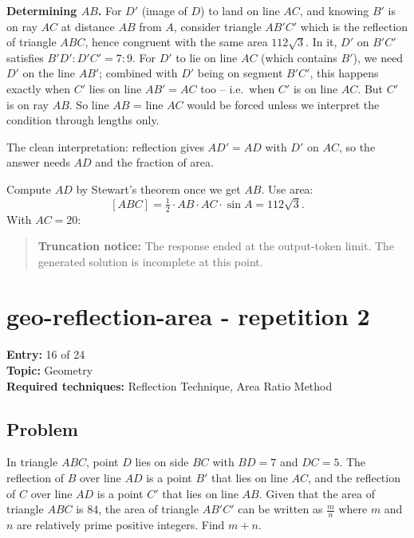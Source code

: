 \documentclass[
  11pt,
  letterpaper,
]{article}
\begin{document}
\textbf{Determining \(AB\).} For \(D'\) (image of \(D\)) to land on line
\(AC\), and knowing \(B'\) is on ray \(AC\) at distance \(AB\) from
\(A\), consider triangle \(AB'C'\) which is the reflection of triangle
\(ABC\), hence congruent with the same area \(112\sqrt3\). In it, \(D'\)
on \(B'C'\) satisfies \(B'D':D'C' = 7:9\). For \(D'\) to lie on line
\(AC\) (which contains \(B'\)), we need \(D'\) on the line \(AB'\);
combined with \(D'\) being on segment \(B'C'\), this happens exactly
when \(C'\) lies on line \(AB'=AC\) too -- i.e.~when \(C'\) is on line
\(AC\). But \(C'\) is on ray \(AB\). So line \(AB\) = line \(AC\) would
be forced unless we interpret the condition through lengths only.

The clean interpretation: reflection gives \(AD' = AD\) with \(D'\) on
\(AC\), so the answer needs \(AD\) and the fraction of area.

Compute \(AD\) by Stewart's theorem once we get \(AB\). Use area:
\[[ABC] = \tfrac12 \cdot AB \cdot AC \cdot \sin A = 112\sqrt3.\] With
\(AC = 20\):

\begin{quote}
\textbf{Truncation notice:} The response ended at the output-token
limit. The generated solution is incomplete at this point.
\end{quote}

\clearpage

\section{geo-reflection-area - repetition
2}\label{geo-reflection-area---repetition-2}

\textbf{Entry:} 16 of 24\\
\textbf{Topic:} Geometry\\
\textbf{Required techniques:} Reflection Technique, Area Ratio Method

\subsection{Problem}\label{problem-15}

In triangle \(ABC\), point \(D\) lies on side \(BC\) with \(BD = 7\) and
\(DC = 5\). The reflection of \(B\) over line \(AD\) is a point \(B'\)
that lies on line \(AC\), and the reflection of \(C\) over line \(AD\)
is a point \(C'\) that lies on line \(AB\). Given that the area of
triangle \(ABC\) is \(84\), the area of triangle \(AB'C'\) can be
written as \(\tfrac{m}{n}\) where \(m\) and \(n\) are relatively prime
positive integers. Find \(m+n\).
\end{document}

